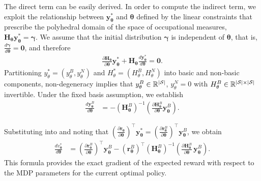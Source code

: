 The direct term can be easily derived. In order to compute the indirect term, we exploit the 
relationship between $\bm{y}_{\bm{\theta}}^*$ and $\bm{\theta}$ defined by the linear constraints 
that prescribe the polyhedral domain of the space of occupational measures,
$\bm{H}_{\bm{\theta}} \bm{y}_{\bm{\theta}}^* = \bm{\gamma}$. 
We assume that the initial distribution $\bm{\gamma}$ is independent of $\bm{\theta}$, that is, 
$\frac{d\bm{\gamma}}{d\bm{\theta}} = \bm{0}$, and therefore
\begin{align*}
    \frac{\partial \bm{H}_{\bm{\theta}}}{\partial \bm{\theta}} \bm{y}_{\bm{\theta}}^*
    + \bm{H}_{\bm{\theta}} \frac{d \bm{y}_{\bm{\theta}}^*}{d \bm{\theta}}
    = \bm{0}.
\end{align*}
Partitioning $y^*_\theta = (y^B_\theta, y^N_\theta)$ and $H^*_\theta = (H^B_\theta, H^N_\theta)$ 
into basic and non-basic components, non-degeneracy implies that $y^B_\theta \in \mathbb{R}^{|{\mathcal{S}}|}$, $y^N_\theta = 0$ with $H^B_\theta \in \mathbb{R}^{|{\mathcal{S}}| \times |{\mathcal{S}}|}$ invertible.
Under the fixed basis assumption, we establish
\begin{align}
    \frac{d \bm{y}_{\bm{\theta}}^B}{d \bm{\theta}}
    & = - \left(\bm{H}_{\bm{\theta}}^B\right)^{-1}
    \left( \frac{\partial \bm{H}_{\bm{\theta}}^B}{\partial \bm{\theta}} \bm{y}_{\bm{\theta}}^B \right).
    \label{eq:jaco}
\end{align}

Substituting  into  and noting that
$\left( \frac{\partial \bm{r}_{\bm{\theta}}}{\partial \bm{\theta}} \right)^\top 
    \bm{y}_{\bm{\theta}}^* 
    = \left( \frac{\partial \bm{r}_{\bm{\theta}}^{B}}{\partial \bm{\theta}} \right)^\top 
    \bm{y}_{\bm{\theta}}^B$,
we obtain
\begin{align}
    \frac{d v_{\bm{\theta}}^*}{d\bm{\theta}}
    &=
    \left( \frac{\partial \bm{r}_{\bm{\theta}}^{B}}{\partial \bm{\theta}} \right)^\top 
    \bm{y}_{\bm{\theta}}^B
    -
    \left(\bm{r}_{\bm{\theta}}^{B}\right)^\top
    \left( \bm{H}_{\bm{\theta}}^{B} \right)^{-1}
    \left( 
        \frac{\partial \bm{H}_{\bm{\theta}}^B}{\partial \bm{\theta}} 
        \, \bm{y}_{\bm{\theta}}^B
    \right).
    \label{eq:dfl_gradient}
\end{align}
This formula provides the exact gradient of the expected reward with respect to the MDP parameters for the current optimal policy.

